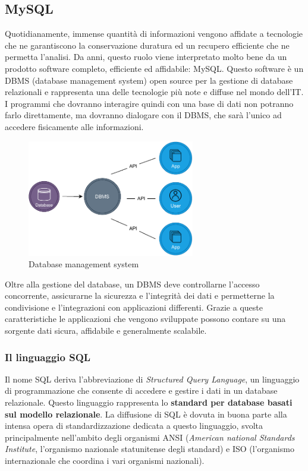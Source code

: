 \subsection{MySQL}
Quotidianamente, immense quantità di informazioni vengono affidate a tecnologie che ne garantiscono la conservazione duratura ed un recupero efficiente che ne permetta l’analisi. Da anni, questo ruolo viene interpretato molto bene da un prodotto software completo, efficiente ed affidabile: MySQL. Questo software è un DBMS (database management system) open source per la gestione di database relazionali e rappresenta una delle tecnologie più note e diffuse nel mondo dell'IT. I programmi che dovranno interagire quindi con una base di dati non potranno farlo direttamente, ma dovranno dialogare con il DBMS, che sarà l’unico ad accedere fisicamente alle informazioni.
\begin{figure}[H]
    \centering
    \includegraphics[width=0.65\textwidth]{images/01_6_dbms.pdf}
    \caption{Database management system}
    \label{fig:databasemanagementsystem}
\end{figure}
Oltre alla gestione del database, un DBMS deve controllarne l'accesso concorrente, assicurarne la sicurezza e l'integrità dei dati e permetterne la condivisione e l'integrazioni con applicazioni differenti. Grazie a queste caratteristiche le applicazioni che vengono sviluppate possono contare su una sorgente dati sicura, affidabile e generalmente scalabile.

\subsubsection{Il linguaggio SQL}
Il nome SQL deriva l’abbreviazione di \textit{Structured Query Language}, un linguaggio di programmazione che consente di accedere e gestire i dati in un database relazionale. Questo linguaggio rappresenta lo \textbf{standard per database basati sul modello relazionale}. La diffusione di SQL è dovuta in buona parte alla intensa opera di standardizzazione dedicata a questo linguaggio, svolta principalmente nell'ambito degli organismi ANSI (\textit{American national Standards Institute}, l'organismo nazionale statunitense degli standard) e ISO (l'organismo internazionale che coordina i vari organismi nazionali).

